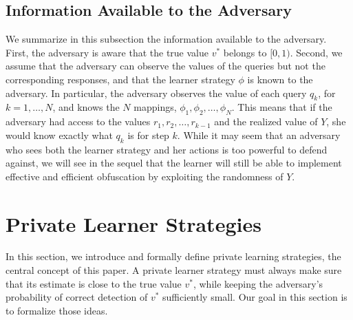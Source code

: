 \documentclass[final,12pt]{colt2018}
\begin{document}

\subsection{Information Available to the Adversary}
\label{sec:adv_info}
We summarize in this subsection the information available to the adversary. First, the adversary is aware that the true value $v^*$ belongs to $[0,1)$. Second, we assume that the adversary can observe the values of the queries but not the corresponding responses, and that the {learner} strategy $\phi$ is known to the adversary. In particular, the adversary observes the value of each query $q_k${,} for $k=1,\dots,N$, and knows the $N$ mappings, $\phi_1,\phi_2,\dots,\phi_N$. This means that if the adversary had access to the values $r_1,r_2,\dots,r_{k-1}$ and the realized value of $Y$, she would know exactly what $q_k$ is for step $k$. While it may seem that an adversary who sees both the {learner} strategy and her actions is too powerful to defend against, we will see in the sequel that the {learner} will still be able to implement effective and efficient obfuscation by exploiting the randomness of $Y$.  
\section{Private {Learner} Strategies}\label{sec:privatestrategycomplex}
In this section, we introduce and formally define private learning strategies, the central concept of this paper. 
A private {learner} strategy must always make sure that its estimate is close to the true value $v^*$, while keeping the {adversary}'s probability of correct detection of $v^*$  sufficiently small. Our goal in this section is to formalize those ideas. 
\end{document}
